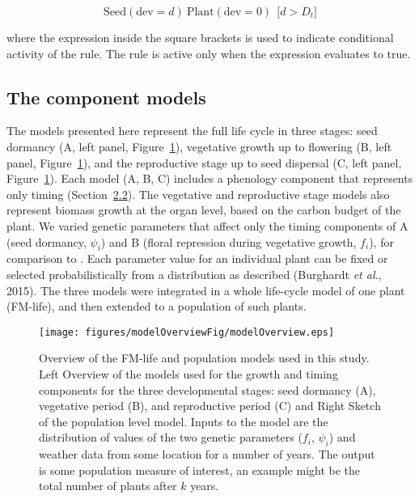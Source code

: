 \documentclass[phd]{infthesis}
\begin{document}
\[\text{Seed}\left( \text{dev} = d \right)\ \text{Plant}\left( \text{dev} = 0 \right)\ \ \lbrack d > D_{t}\rbrack\]

where the expression inside the square brackets is used to indicate
conditional activity of the rule. The rule is active only when the
expression evaluates to true.

\subsection{The component models}
\label{the-component-models}

The models presented here represent the full life cycle in three stages:
seed dormancy (A, left panel, Figure~\ref{fig:overview}), vegetative growth up to
flowering (B, left panel, Figure~\ref{fig:overview}), and the reproductive stage up to
seed dispersal (C, left panel, Figure~\ref{fig:overview}). Each model (A, B, C) includes
a phenology component that represents only timing
(Section~\protect\hyperlink{phenology-models-in-chromar}{2.2}). The
vegetative and reproductive stage models also represent biomass growth
at the organ level, based on the carbon budget of the plant. We varied
genetic parameters that affect only the timing components of A (seed
dormancy, \(\psi_{i}\)) and B (floral repression during vegetative
growth, \(f_{i}\)), for comparison to \citet{burghardt_modeling_2015}.
Each parameter value for an individual plant can be fixed or selected
probabilistically from a distribution as described (Burghardt \emph{et
al.}, 2015). The three models were integrated in a whole life-cycle
model of one plant (FM-life), and then extended to a population of such
plants.

\begin{figure}[tb]
  \centering
\texttt{[image: figures/modelOverviewFig/modelOverview.eps]}
\caption{Overview of the FM-life and population models used in this
study. Left Overview of the models used for the growth and timing
components for the three developmental stages: seed dormancy (A),
vegetative period (B), and reproductive period (C) and Right Sketch of
the population level model. Inputs to the model are the distribution of
values of the two genetic parameters (\(f_{i}\), \(\psi_{i}\)) and
weather data from some location for a number of years. The output is
some population measure of interest, an example might be the total
number of plants after \(k\) years.}
\label{fig:overview}
\end{figure}
\end{document}
